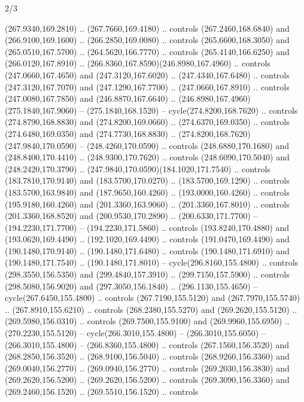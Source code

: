 \begin{flagdescription}{2/3}
\begin{scope}[xshift=0.5\flaglength,yshift=0.5\flagwidth,scale=\flagwidth/259.2]
\begin{scope}[y=0.8pt, x=0.8pt, yscale=-1,shift={(-243,-162)}]
      (267.9340,169.2810) .. (267.7660,169.4180) .. controls (267.2460,168.6840) and
      (266.9100,169.1600) .. (266.2850,169.0080) .. controls (265.6600,168.3050) and
      (265.0510,167.5700) .. (264.5620,166.7770) .. controls (265.4140,166.6250) and
      (266.0120,167.8910) .. (266.8360,167.8590)(246.8980,167.4960) .. controls
      (247.0660,167.4650) and (247.3120,167.6020) .. (247.4340,167.6480) .. controls
      (247.3120,167.7070) and (247.1290,167.7700) .. (247.0660,167.8910) .. controls
      (247.0080,167.7850) and (246.8870,167.6640) ..
      (246.8980,167.4960)(275.1840,167.9060) -- (275.1840,168.1520) --
      cycle(274.8200,168.7620) .. controls (274.8790,168.8830) and
      (274.8200,169.0660) .. (274.6370,169.0350) .. controls (274.6480,169.0350) and
      (274.7730,168.8830) .. (274.8200,168.7620)(247.9840,170.0590) --
      (248.4260,170.0590) .. controls (248.6880,170.1680) and (248.8400,170.4410) ..
      (248.9300,170.7620) .. controls (248.6090,170.5040) and (248.2420,170.3790) ..
      (247.9840,170.0590)(184.1020,171.7540) .. controls (183.7810,170.9140) and
      (183.5700,170.0270) .. (183.5700,169.1290) .. controls (183.5700,163.9840) and
      (187.9650,160.4260) .. (193.0000,160.4260) .. controls (195.9180,160.4260) and
      (201.3360,163.9060) .. (201.3360,167.8010) .. controls (201.3360,168.8520) and
      (200.9530,170.2890) .. (200.6330,171.7700) -- (194.2230,171.7700) --
      (194.2230,171.5860) .. controls (193.8240,170.4880) and (193.0620,169.4490) ..
      (192.1020,169.4490) .. controls (191.0470,169.4490) and (190.1480,170.9140) ..
      (190.1480,171.6480) .. controls (190.1480,171.6910) and (190.1480,171.7540) ..
      (190.1480,171.8010) -- cycle(296.8160,155.4800) .. controls
      (298.3550,156.5350) and (299.4840,157.3910) .. (299.7150,157.5900) .. controls
      (298.5080,156.9020) and (297.3050,156.1840) .. (296.1130,155.4650) --
      cycle(267.6450,155.4800) .. controls (267.7190,155.5120) and
      (267.7970,155.5740) .. (267.8910,155.6210) .. controls (268.2380,155.5270) and
      (269.2620,155.5120) .. (269.5980,156.0310) .. controls (269.7500,155.9100) and
      (269.9960,155.6950) .. (270.2230,155.5120) -- cycle(266.3010,155.4800) --
      (266.3010,155.6050) -- (266.3010,155.4800) -- (266.8360,155.4800) .. controls
      (267.1560,156.3520) and (268.2850,156.3520) .. (268.9100,156.5040) .. controls
      (268.9260,156.3360) and (269.0040,156.2770) .. (269.0940,156.2770) .. controls
      (269.2030,156.3830) and (269.2620,156.5200) .. (269.2620,156.5200) .. controls
      (269.3090,156.3360) and (269.2460,156.1520) .. (269.5510,156.1520) .. controls

\end{scope}
\end{scope}
\end{flagdescription}
